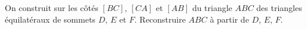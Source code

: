 On construit sur les côtés $[BC]$, $[CA]$ et $[AB]$ du triangle $ABC$ des triangles équilatéraux de sommets $D$, $E$ et $F$. Reconstruire $ABC$ à partir de $D$, $E$, $F$.
